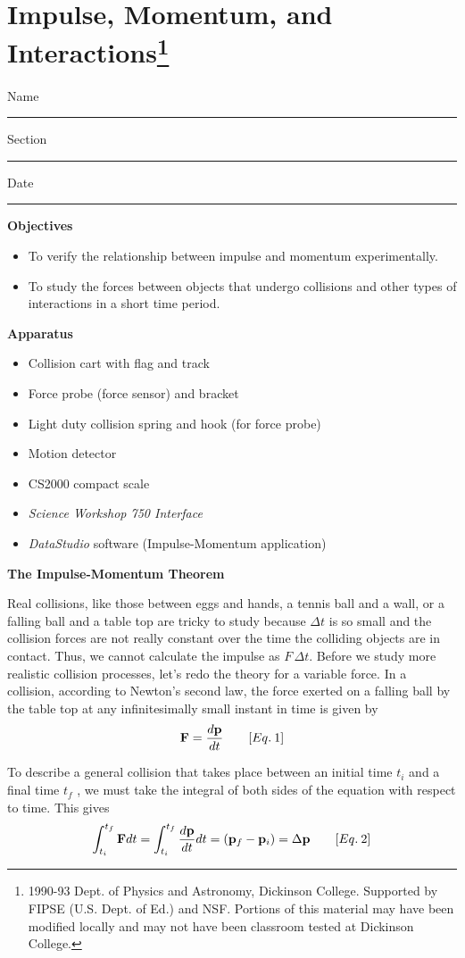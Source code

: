 
\section{Impulse, Momentum, and Interactions\footnote{
1990-93 Dept. of Physics and Astronomy, Dickinson College. Supported by FIPSE
(U.S. Dept. of Ed.) and NSF. Portions of this material may have been modified
locally and may not have been classroom tested at Dickinson College.
}}

Name \rule{2.0in}{0.1pt}\hfill{}Section \rule{1.0in}{0.1pt}\hfill{}Date \rule{1.0in}{0.1pt}

\textbf{Objectives }

\begin{itemize}
\item To verify the relationship between impulse and momentum experimentally. 
\item To study the forces between objects that undergo collisions and other types of interactions in a short time period.
\end{itemize}
\textbf{Apparatus} 

\begin{itemize}
\item Collision cart with flag and track 
\item Force probe (force sensor) and bracket
\item Light duty collision spring and hook (for force probe)
\item Motion detector
\item CS2000 compact scale
\item \textit{Science Workshop 750 Interface}
\item \textit{DataStudio} software (Impulse-Momentum application)
\end{itemize}
\textbf{The Impulse-Momentum Theorem }

Real collisions, like those between eggs and hands, a tennis ball and a wall, or
a falling ball and a table top are tricky to study because $\Delta t$ 
is so small and
the collision forces are not really constant over the time the colliding objects
are in contact. Thus, we cannot calculate the impulse as $F \,\Delta t$. 
Before we study
more realistic collision processes, let's redo the theory for a variable force.
In a collision, according to Newton's second law, the force exerted on a falling
ball by the table top at any infinitesimally small instant in time is given
by
\[
{\bf F}=\frac{d{\bf p}}{dt}\qquad [Eq.\: 1]\]


To describe a general collision that takes place between an initial time \( t_{i} \)
and a final time \( t_{f} \) , we must take the integral of both sides of the
equation with respect to time. This gives
\[
\int _{t_{i}}^{t_{f}}{\bf F}dt=\int _{t_{i}}^{t_{f}}\frac{d{\bf p}}{dt}dt=\left( {{\bf p}_{f}}-{{\bf p}_{i}}\right) =\Delta {\bf p}\qquad [Eq.\: 2]\]


